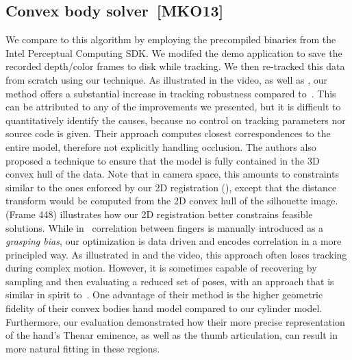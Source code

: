 



\subsection*{Convex body solver~[MKO13]}

We compare to this algorithm by employing the precompiled binaries from the Intel Perceptual Computing SDK. We modifed the demo application to save the recorded depth/color frames to disk while tracking. We then re-tracked this data from scratch using our technique. As illustrated in the video, as well as , our method offers a substantial increase in tracking  robustness compared to~\cite{melax2013dynamics}. 
% 
This can be attributed to any of the improvements we presented, but it is difficult to quantitatively identify the causes, because no control on tracking parameters nor source code is given. 
% 
Their approach computes closest correspondences to the entire model, therefore not explicitly handling occlusion. 
%
The authors also proposed a technique to ensure that the model is fully contained in the 3D convex hull of the data. Note that in camera space, this amounts to constraints similar to the ones enforced by our 2D registration (), except that the distance transform would be computed from the 2D convex hull of the silhouette image.  (Frame 448) illustrates how our 2D registration better constrains feasible solutions. 
% 
While in~\cite{melax2013dynamics} correlation between fingers is manually introduced as a \emph{grasping bias}, our optimization is data driven and encodes correlation in a more principled way. As illustrated in  and the video, this approach often loses tracking during complex motion. However, it is sometimes capable of recovering by sampling and then evaluating a reduced set of poses, with an approach that is similar in spirit to~\cite{oiko2011hand}.
% 
One advantage of their method is the higher geometric fidelity of their convex bodies hand model compared to our cylinder model. Furthermore, our evaluation demonstrated how their more precise representation of the hand's Thenar eminence, as well as the thumb articulation, can result in more natural fitting in these regions.


